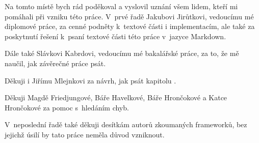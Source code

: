 Na tomto místě bych rád poděkoval a vyslovil uznání všem lidem, kteří mi pomáhali při vzniku této práce. V~prvé řadě Jakubovi Jirůtkovi, vedoucímu mé diplomové práce, za cenné podněty k~textové části i implementacím, ale také za poskytnutí řešení k~psaní textové části této práce v~jazyce Markdown.

Dále také Slávkovi Kabrdovi, vedoucímu mé bakalářské práce, za to, že mě naučil, jak závěrečné práce psát.

Děkuji i Jiřímu Mlejnkovi za návrh, jak psát kapitolu \emph{}.

Děkuji Magdě Friedjungové, Báře Havelkové, Báře Hrončokové a Katce Hrončokové za pomoc s~hledáním chyb.

V~neposlední řadě také děkuji desítkám autorů zkoumaných frameworků, bez jejichž úsilí by tato práce neměla důvod vzniknout.
